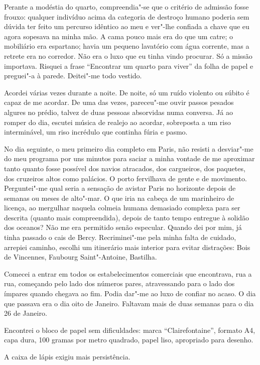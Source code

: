 Perante a modéstia do quarto, compreendia"-se que o critério de admissão
fosse frouxo: qualquer indivíduo acima da categoria de destroço humano
poderia sem dúvida ter feito um percurso idêntico ao meu e ver"-lhe
confiada a chave que eu agora sopesava na minha mão. A cama pouco mais
era do
que um catre; o mobiliário era espartano; havia um pequeno lavatório com
água corrente, mas a retrete era no corredor. Não era o luxo que eu
tinha vindo procurar. Só a missão importava. Risquei a frase
``Encontrar um quarto para viver'' da folha de papel e preguei"-a à
parede. Deitei"-me todo vestido.

Acordei várias vezes durante a noite. De noite, só um ruído violento ou
súbito é capaz de me acordar. De uma das vezes, pareceu"-me ouvir passos
pesados algures no prédio, talvez de duas pessoas absorvidas numa
conversa. Já ao romper do dia, escutei música de realejo ao acordar,
sobreposta a um riso interminável, um riso incrédulo que continha
fúria e pasmo.

No dia seguinte, o meu primeiro dia completo em Paris, não resisti a
desviar"-me do meu programa por uns minutos para saciar a minha vontade
de me aproximar tanto quanto fosse possível dos navios atracados, dos
cargueiros, dos paquetes, dos cruzeiros altos como palácios. O porto
fervilhava de gente e de movimento. Perguntei"-me qual seria a sensação
de avistar Paris no horizonte depois de semanas ou meses de alto"-mar. O
que iria na cabeça de um marinheiro de licença, ao mergulhar naquela
colmeia humana demasiado complexa para ser descrita (quanto mais
compreendida), depois de tanto tempo entregue à solidão dos oceanos? Não
me era permitido senão especular. Quando dei por mim, já tinha passado
o cais de Bercy. Recriminei"-me pela minha falta de cuidado, arrepiei
caminho, escolhi um itinerário mais interior para evitar distrações:
Bois de Vincennes, Faubourg Saint"-Antoine, Bastilha.

Comecei a entrar em todos os estabelecimentos comerciais que encontrava,
rua a rua, começando pelo lado dos números pares, atravessando para o
lado dos ímpares quando chegava ao fim. Podia dar"-me ao luxo de confiar
no acaso. O dia que
passava era o dia oito de Janeiro. Faltavam mais de duas semanas para
o dia 26 de Janeiro.

Encontrei o bloco de papel sem dificuldades: marca ``Clairefontaine'',
formato A4, capa dura, 100 gramas por metro quadrado, papel liso,
apropriado para desenho.

A caixa de lápis exigiu mais persistência.

